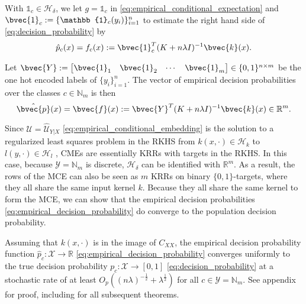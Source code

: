 \documentclass[runningheads, envcountsame, a4paper]{llncs}
\begin{document}
		With $\mathbb{1}_{c} \in \mathcal{H}_{\delta}$, we let $g = \mathbb{1}_{c}$ in \eqref{eq:empirical_conditional_expectation} and $\bvec{1}_{c} := \{\mathbb{1}_{c}(y_{i})\}_{i = 1}^{n}$ to estimate the right hand side of \eqref{eq:decision_probability} by
		\begin{equation}
			\hat{p}_{c}(x) = f_{c}(x) := \bvec{1}_{c}^{T} (K + n \lambda I)^{-1} \bvec{k}(x).
		\label{eq:empirical_decision_probability}
		\end{equation}
		
		Let $\bvec{Y} := \begin{bmatrix} \bvec{1}_{1} & \bvec{1}_{2} & \cdots & \bvec{1}_{m} \end{bmatrix} \in \{0, 1\}^{n \times m}$ be the one hot encoded labels of $\{y_{i}\}_{i = 1}^{n}$. The vector of empirical decision probabilities over the classes $c \in \mathbb{N}_{m}$ is then
		\begin{equation}
			\hat{\bvec{p}}(x) = \bvec{f}(x) := \bvec{Y}^{T} (K + n \lambda I)^{-1} \bvec{k}(x) \in \mathbb{R}^{m}.
		\label{eq:empirical_decision_probability_vector}
		\end{equation}
		
		Since $\mathcal{U} = \hat{\mathcal{U}}_{Y | X}$ \eqref{eq:empirical_conditional_embedding} is the solution to a regularized least squares problem in the RKHS from $k(x, \cdot) \in \mathcal{H}_{k}$ to $l(y, \cdot) \in \mathcal{H}_{l}$ \citep{grunewalder2012conditional}, \glspl{CME} are essentially \glspl{KRR} with targets in the \gls{RKHS}. In this case, because $\mathcal{Y} = \mathbb{N}_{m}$ is discrete, $\mathcal{H}_{\delta}$ can be identified with $\mathbb{R}^{m}$. As a result, the rows of the \gls{MCE} can also be seen as $m$ \glspl{KRR} \citep{friedman2001elements} on binary $\{0, 1\}$-targets, where they all share the same input kernel $k$. Because they all share the same kernel to form the \gls{MCE}, we can show that the empirical decision probabilities \eqref{eq:empirical_decision_probability} do converge to the population decision probability.
	
		\begin{theorem}
			\label{thm:probability_convergence_copy}
			Assuming that $k(x, \cdot)$ is in the image of $C_{XX}$, the empirical decision probability function $\hat{p}_{c} : \mathcal{X} \to \mathbb{R}$ \eqref{eq:empirical_decision_probability} converges uniformly to the true decision probability $p_{c} : \mathcal{X} \to [0, 1]$ \eqref{eq:decision_probability} at a stochastic rate of at least $O_{p}((n \lambda)^{-\frac{1}{2}} + \lambda^{\frac{1}{2}})$ for all $c \in \mathcal{Y} = \mathbb{N}_{m}$. See appendix for proof, including for all subsequent theorems.
		\end{theorem}
		
\end{document}
